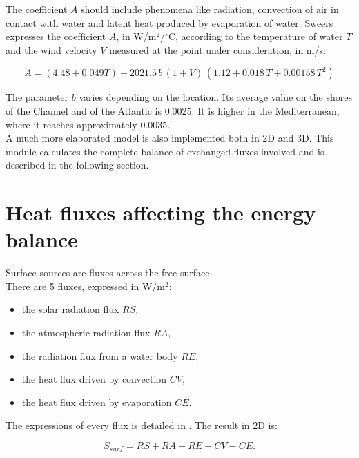 The coefficient $A$ should include phenomena like radiation, convection of air
in contact with water and latent heat produced by evaporation of water. Sweers
\cite{sweers_wind_1976} expresses the coefficient $A$, in W/m$^{2}$/${^{\circ}}$C,
according to the temperature of water $T$ and the wind velocity $V$ measured
at the point under consideration, in m/s:%

\begin{equation}
\label{sweers}A=(4.48+0.049T)+2021.5\,b\,(1+V)\,(1.12+0.018\,T+0.00158\,T^{2})
\end{equation}

The parameter $b$ varies depending on the location. Its average value on the
shores of the Channel and of the Atlantic is 0.0025. It is higher in the
Mediterranean, where it reaches approximately 0.0035.\\

A much more elaborated model is also implemented both in 2D and 3D.
This module calculates the complete balance of exchanged fluxes involved
and is described in the following section.

\section{Heat fluxes affecting the energy balance}

Surface sources are fluxes across the free surface.\\

There are 5 fluxes, expressed in W/m$^2$:

\begin{itemize}
\item the solar radiation flux $RS$,
\item the atmospheric radiation flux $RA$,
\item the radiation flux from a water body $RE$,
\item the heat flux driven by convection $CV$,
\item the heat flux driven by evaporation $CE$.
\end{itemize}

The expressions of every flux is detailed in
\cite{gilbert_num_comp_nat_river_1986}. The result in 2D is:

\begin{equation}
  S_{surf} = RS + RA - RE - CV - CE.
\end{equation}

